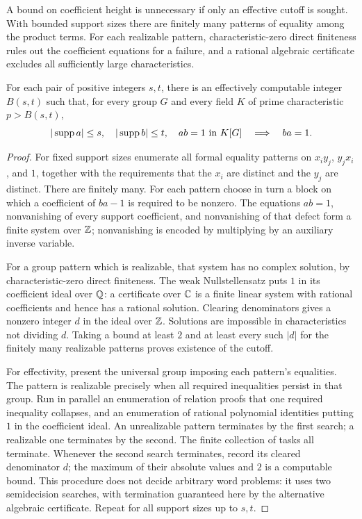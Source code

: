 A bound on coefficient height is unnecessary if only an effective cutoff is sought. With bounded support sizes there are finitely many patterns of equality among the product terms. For each realizable pattern, characteristic-zero direct finiteness rules out the coefficient equations for a failure, and a rational algebraic certificate excludes all sufficiently large characteristics.

\begin{proposition}\label{prop:cutoff}
For each pair of positive integers $s,t$, there is an effectively computable integer $B(s,t)$ such that, for every group $G$ and every field $K$ of prime characteristic $p>B(s,t)$,
\[
 |\operatorname{supp} a|\le s,\quad |\operatorname{supp} b|\le t,\quad ab=1\text{ in }K[G]
 \quad\Longrightarrow\quad ba=1.
\]
\end{proposition}
\begin{proof}
For fixed support sizes enumerate all formal equality patterns on $x_iy_j$, $y_jx_i$, and $1$, together with the requirements that the $x_i$ are distinct and the $y_j$ are distinct. There are finitely many. For each pattern choose in turn a block on which a coefficient of $ba-1$ is required to be nonzero. The equations $ab=1$, nonvanishing of every support coefficient, and nonvanishing of that defect form a finite system over $\mathbb Z$; nonvanishing is encoded by multiplying by an auxiliary inverse variable.

For a group pattern which is realizable, that system has no complex solution, by characteristic-zero direct finiteness. The weak Nullstellensatz puts $1$ in its coefficient ideal over $\mathbb Q$: a certificate over $\mathbb C$ is a finite linear system with rational coefficients and hence has a rational solution. Clearing denominators gives a nonzero integer $d$ in the ideal over $\mathbb Z$. Solutions are impossible in characteristics not dividing $d$. Taking a bound at least $2$ and at least every such $|d|$ for the finitely many realizable patterns proves existence of the cutoff.

For effectivity, present the universal group imposing each pattern's equalities. The pattern is realizable precisely when all required inequalities persist in that group. Run in parallel an enumeration of relation proofs that one required inequality collapses, and an enumeration of rational polynomial identities putting $1$ in the coefficient ideal. An unrealizable pattern terminates by the first search; a realizable one terminates by the second. The finite collection of tasks all terminate. Whenever the second search terminates, record its cleared denominator $d$; the maximum of their absolute values and $2$ is a computable bound. This procedure does not decide arbitrary word problems: it uses two semidecision searches, with termination guaranteed here by the alternative algebraic certificate. Repeat for all support sizes up to $s,t$.
\end{proof}


